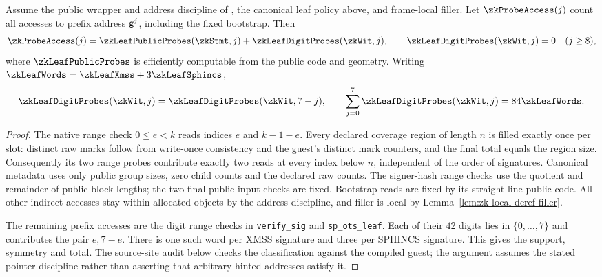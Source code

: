 \begin{proposition}\label{prop:zk-leaf-probe-profile}
Assume the public wrapper and address discipline of , the canonical leaf policy above, and frame-local filler. Let $\zkProbeAccess(j)$ count all accesses to prefix address $\mathsf{g}^j$, including the fixed bootstrap. Then
\[
 \zkProbeAccess(j)=\zkLeafPublicProbes(\zkStmt,j)+\zkLeafDigitProbes(\zkWit,j),
 \qquad \zkLeafDigitProbes(\zkWit,j)=0\quad(j\ge8),
\]
where $\zkLeafPublicProbes$ is efficiently computable from the public code and geometry. Writing $\zkLeafWords=\zkLeafXmss+3\zkLeafSphincs$,
\[
 \zkLeafDigitProbes(\zkWit,j)=\zkLeafDigitProbes(\zkWit,7-j),
 \qquad \sum_{j=0}^7\zkLeafDigitProbes(\zkWit,j)=84\zkLeafWords.
\]
\end{proposition}
\begin{proof}
The native range check $0\le e<k$ reads indices $e$ and $k-1-e$. Every declared coverage region of length $n$ is filled exactly once per slot: distinct raw marks follow from write-once consistency and the guest's distinct mark counters, and the final total equals the region size. Consequently its two range probes contribute exactly two reads at every index below $n$, independent of the order of signatures. Canonical metadata uses only public group sizes, zero child counts and the declared raw counts. The signer-hash range checks use the quotient and remainder of public block lengths; the two final public-input checks are fixed. Bootstrap reads are fixed by its straight-line public code. All other indirect accesses stay within allocated objects by the address discipline, and filler is local by Lemma~\ref{lem:zk-local-deref-filler}.

The remaining prefix accesses are the digit range checks in \texttt{verify\_sig} and \texttt{sp\_ots\_leaf}. Each of their $42$ digits lies in $\{0,\ldots,7\}$ and contributes the pair $e,7-e$. There is one such word per XMSS signature and three per SPHINCS signature. This gives the support, symmetry and total. The source-site audit below checks the classification against the compiled guest; the argument assumes the stated pointer discipline rather than asserting that arbitrary hinted addresses satisfy it.
\end{proof}

